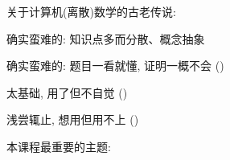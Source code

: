 
\begin{frame}{}
\end{frame}

\begin{frame}{}
  \begin{center}
    {\large 关于计算机(离散)数学的古老传说:}

    \vspace{0.80cm}


    \vspace{0.60cm}

  \end{center}
\end{frame}

\begin{frame}{}
  \begin{center}

    \pause
    \vspace{0.80cm}
    {\large 确实蛮难的: 知识点多而分散、概念抽象}

    \vspace{0.50cm}
    {\large 确实蛮难的: 题目一看就懂, 证明一概不会 ()}
  \end{center}
\end{frame}

\begin{frame}{}
  \begin{center}

    \pause
    \vspace{0.80cm}
    {\large 太基础, 用了但不自觉 ()}

    \vspace{0.50cm}
    {\large 浅尝辄止, 想用但用不上 ()}
  \end{center}
\end{frame}

\begin{frame}{}
  \begin{center}
    本课程最重要的主题: 

    \vspace{1em}
  \end{center}
\end{frame}

